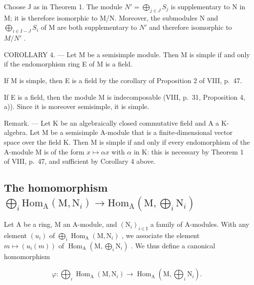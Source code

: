 Choose J as in Theorem 1. The module \(N' = \bigoplus_{j \in J} S_j\) is supplementary to N in M; it is therefore isomorphic to M/N. Moreover, the submodules N and \(\bigoplus_{i \in I-J} S_i\) of M are both supplementary to \(N'\) and therefore isomorphic to \(M/N'\) .

COROLLARY 4. --- Let M be a semisimple module. Then M is simple if and only if the endomorphism ring E of M is a field.

If M is simple, then E is a field by the corollary of Proposition 2 of VIII, p.~47.

If E is a field, then the module M is indecomposable (VIII, p.~31, Proposition 4, a)). Since it is moreover semisimple, it is simple.

Remark. --- Let K be an algebraically closed commutative field and A a K-algebra. Let M be a semisimple A-module that is a finite-dimensional vector space over the field K. Then M is simple if and only if every endomorphism of the A-module M is of the form \(x \mapsto \alpha x\) with \(\alpha\) in K: this is necessary by Theorem 1 of VIII, p.~47, and sufficient by Corollary 4 above.

\subsection{\texorpdfstring{The homomorphism \(\bigoplus_{i} \mathrm{Hom}_{\mathrm{A}}(\mathrm{M}, \mathrm{N}_{i}) \longrightarrow \mathrm{Hom}_{\mathrm{A}}(\mathrm{M}, \bigoplus_{i} \mathrm{N}_{i})\)}{The homomorphism \textbackslash bigoplus\_\{i\} \textbackslash mathrm\{Hom\}\_\{\textbackslash mathrm\{A\}\}(\textbackslash mathrm\{M\}, \textbackslash mathrm\{N\}\_\{i\}) \textbackslash longrightarrow \textbackslash mathrm\{Hom\}\_\{\textbackslash mathrm\{A\}\}(\textbackslash mathrm\{M\}, \textbackslash bigoplus\_\{i\} \textbackslash mathrm\{N\}\_\{i\})}}

Let A be a ring, M an A-module, and \((\mathrm{N}_{i})_{i\in\mathrm{I}}\) a family of A-modules. With any element \((u_{i})\) of \(\bigoplus_{i}\operatorname{Hom}_{\mathrm{A}}(\mathrm{M},\mathrm{N}_{i})\) , we associate the element \(m\mapsto(u_{i}(m))\) of \(\operatorname{Hom}_{\mathrm{A}}(\mathrm{M},\bigoplus_{i}\mathrm{N}_{i})\) . We thus define a canonical homomorphism

\[
\varphi : \bigoplus_ {i} \operatorname{Hom} _ {\mathrm{A}} (\mathrm{M}, \mathrm{N} _ {i}) \longrightarrow \operatorname{Hom} _ {\mathrm{A}} \left(\mathrm{M}, \bigoplus_ {i} \mathrm{N} _ {i}\right).
\]

